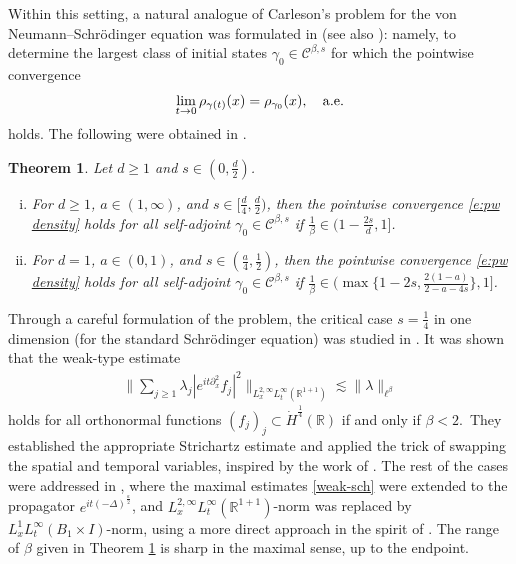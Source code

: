 \documentclass[a4paper]{amsart}
\numberwithin{figure}{section}
\numberwithin{equation}{section}%
\theoremstyle{plain}%
\newtheorem{theorem}{Theorem}[section]
\theoremstyle{definition}
\theoremstyle{remark}%
\def\ae{{\rm a.e.}}
\newcommand{\R}{{\mathbb R}}
\def\C{\mathcal{C}}
\begin{document}
Within this setting, a natural analogue of Carleson’s problem for the von Neumann--Schr\"odinger equation was formulated in \cite{BLN_Selecta} (see also \cite{BKS_TLMS}): namely, to determine the largest class of initial states $\gamma_0\in \C^{\beta,s}$ for which the pointwise convergence
\begin{equation}\label{e:pw density}
    \lim_{t\to0}\rho_{\gamma(t)}(x)
    =
    \rho_{\gamma_0}(x),\quad \ae
\end{equation}
holds.   The following were obtained in \cite{BLN_Selecta,BKS_TLMS}. 



\begin{theorem}\label{thm:fractional}
Let $d\geq1$ and $s\in(0,\frac d2)$. 
\begin{enumerate}[(i)]
    \item For $d\ge1$, $a\in(1,\infty)$, and $s\in[\frac d4, \frac d2)$, then the pointwise convergence \eqref{e:pw density} holds for all self-adjoint $\gamma_0\in \mathcal C^{\beta,s}$ if $\frac{1}{\beta} \in (1-\frac{2s}{d},1]$.
    \item \label{i:m less than 1}For $d=1$, $a\in(0,1)$, and $s\in (\frac a4,\frac12)$, then the pointwise convergence \eqref{e:pw density} holds for all self-adjoint $\gamma_0\in \mathcal C^{\beta,s}$ if $\frac1\beta \in( \max\{{1-2s}, \frac{2(1-a)}{2-a-4s}\}, 1]$. 
\end{enumerate}
\end{theorem}



Through a careful formulation of the problem, the critical case $s=\frac14$ in one dimension (for the standard Schr\"odinger equation) was studied in \cite{BLN_Selecta}. 
It was shown that the weak-type estimate
\begin{align}\label{weak-sch}
\Big\| \sum_{j\ge1} \lambda_j |e^{it\partial_x^2}f_j|^2 \Big\|_{L_x^{2,\infty}L_t^\infty(\R^{1+1})}
\lesssim \|\lambda\|_{\ell^\beta}
\end{align}
holds for all orthonormal functions $(f_j)_j\subset \dot{H}^{\frac14}(\R)$ if and only if $\beta<2$.\footnotemark  \, They established the appropriate Strichartz estimate and applied the trick of swapping the spatial and temporal variables, inspired by the work of \cite{KPV91}. The rest of the cases were addressed in \cite{BKS_TLMS}, where the maximal estimates \eqref{weak-sch}  were extended to the propagator $e^{it(-\Delta)^{\frac a2}}$, and $L_x^{2,\infty}L_t^\infty(\R^{1+1})$-norm was replaced by $L_x^1L_t^\infty(B_1\times I)$-norm, using a more direct approach in the spirit of \cite{BBCR11,CS22}. 
The range of $\beta$ given in Theorem \ref{thm:fractional} is sharp in the maximal sense, up to the endpoint.\\
\end{document}
